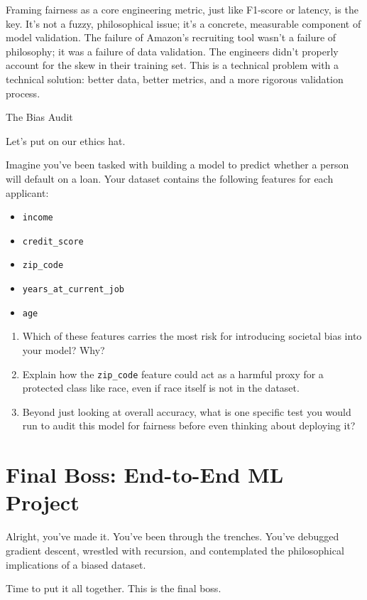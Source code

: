 \documentclass[11pt, letterpaper, openany]{book}
\begin{document}
Framing fairness as a core engineering metric, just like F1-score or latency, is the key. It's not a fuzzy, philosophical issue; it's a concrete, measurable component of model validation. The failure of Amazon's recruiting tool wasn't a failure of philosophy; it was a failure of data validation. The engineers didn't properly account for the skew in their training set. This is a technical problem with a technical solution: better data, better metrics, and a more rigorous validation process.

\begin{challengebox}
The Bias Audit

Let's put on our ethics hat.

Imagine you've been tasked with building a model to predict whether a person will default on a loan. Your dataset contains the following features for each applicant:
\begin{itemize}
    \item \texttt{income}
    \item \texttt{credit\_score}
    \item \texttt{zip\_code}
    \item \texttt{years\_at\_current\_job}
    \item \texttt{age}
\end{itemize}
\begin{enumerate}
    \item Which of these features carries the most risk for introducing societal bias into your model? Why?
    \item Explain how the \texttt{zip\_code} feature could act as a harmful proxy for a protected class like race, even if race itself is not in the dataset.
    \item Beyond just looking at overall accuracy, what is one specific test you would run to audit this model for fairness before even thinking about deploying it?
\end{enumerate}
\end{challengebox}

\chapter{Final Boss: End-to-End ML Project}

Alright, you've made it. You've been through the trenches. You've debugged gradient descent, wrestled with recursion, and contemplated the philosophical implications of a biased dataset.

Time to put it all together. This is the final boss.
\end{document}
